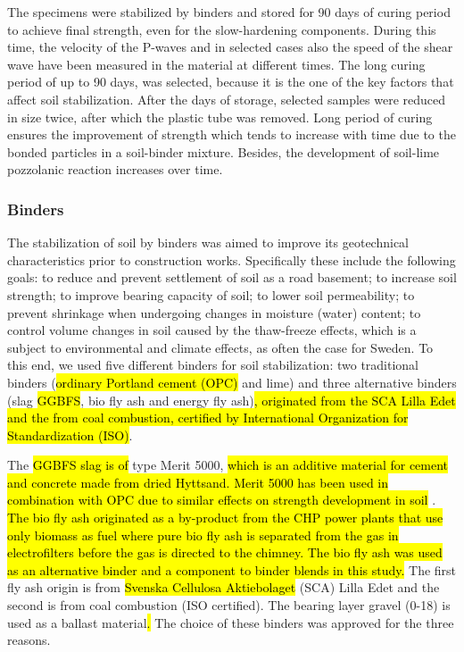 \documentclass[materials,article,submit,pdftex,moreauthors]{Definitions/mdpi}
\begin{document}
The specimens were stabilized by binders and stored for 90 days of curing period to achieve final strength, even for the slow-hardening components. During this time, the velocity of the P-waves and in selected cases also the speed of the shear wave have been measured in the material at different times. The long curing period of up to 90 days, was selected, because it is the one of the key factors that affect soil stabilization. After the  days of storage, selected samples were reduced in size twice, after which the plastic tube was removed. Long period of curing ensures the improvement of strength which tends to increase with time due to the bonded particles in a soil-binder mixture. Besides, the development of soil-lime pozzolanic reaction increases over time. 

\subsubsection{Binders}
The stabilization of soil by binders was aimed to improve its geotechnical characteristics prior to construction works. Specifically these include the following goals: to reduce and prevent settlement of soil as a road basement; to increase soil strength; to improve bearing capacity of soil; to lower soil permeability; to prevent shrinkage when undergoing changes in moisture (water) content; to control volume changes in soil caused by the thaw-freeze effects, which is a subject to environmental and climate effects, as often the case for Sweden. To this end, we used five different binders for soil stabilization: two traditional binders (\hl{ordinary Portland cement (OPC)} and lime) and three alternative binders (slag \hl{GGBFS}, bio fly ash and energy fly ash)\hl{, originated from the SCA Lilla Edet and the from coal combustion, certified by International Organization for Standardization (ISO)}.

The \hl{GGBFS slag is of} type Merit 5000, \hl{which is an additive material for cement and concrete made from dried Hyttsand. Merit 5000 has been used in combination with OPC due to similar effects on strength development in soil} \cite{SSAB}. \hl{The bio fly ash originated as a by-product from the CHP power plants that use only biomass as fuel where pure bio fly ash is separated from the gas in electrofilters before the gas is directed to the chimney. The bio fly ash was used as an alternative binder and a component to binder blends in this study.} The first fly ash origin is from \hl{Svenska Cellulosa Aktiebolaget} (SCA) Lilla Edet and the second is from coal combustion (ISO certified). The bearing layer gravel (0-18) is used as a ballast material\hl{. }The choice of these binders was approved for the three reasons. 
\end{document}
